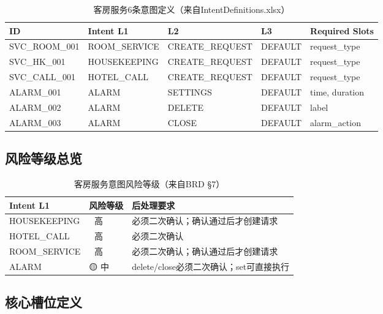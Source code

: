 \documentclass[12pt,a4paper]{ctexart}
\begin{document}
\begin{table}[h]
\centering
\begin{tabular}{@{}llllp{3.5cm}@{}}
\toprule
\textbf{ID} & \textbf{Intent L1} & \textbf{L2} & \textbf{L3} & \textbf{Required Slots} \\
\midrule
SVC\_ROOM\_001 & ROOM\_SERVICE & CREATE\_REQUEST & DEFAULT & request\_type \\
SVC\_HK\_001 & HOUSEKEEPING & CREATE\_REQUEST & DEFAULT & request\_type \\
SVC\_CALL\_001 & HOTEL\_CALL & CREATE\_REQUEST & DEFAULT & request\_type \\
ALARM\_001 & ALARM & SETTINGS & DEFAULT & time, duration \\
ALARM\_002 & ALARM & DELETE & DEFAULT & label \\
ALARM\_003 & ALARM & CLOSE & DEFAULT & alarm\_action \\
\bottomrule
\end{tabular}
\caption{客房服务6条意图定义（来自IntentDefinitions.xlsx）}
\end{table}

\subsection{风险等级总览}

\begin{table}[h]
\centering
\begin{tabular}{@{}llp{5cm}@{}}
\toprule
\textbf{Intent L1} & \textbf{风险等级} & \textbf{后处理要求} \\
\midrule
HOUSEKEEPING & 🔴 高 & 必须二次确认；确认通过后才创建请求 \\
HOTEL\_CALL & 🔴 高 & 必须二次确认 \\
ROOM\_SERVICE & 🔴 高 & 必须二次确认；确认通过后才创建请求 \\
ALARM & 🟡 中 & delete/close必须二次确认；set可直接执行 \\
\bottomrule
\end{tabular}
\caption{客房服务意图风险等级（来自BRD §7）}
\end{table}

\subsection{核心槽位定义}
\end{document}
